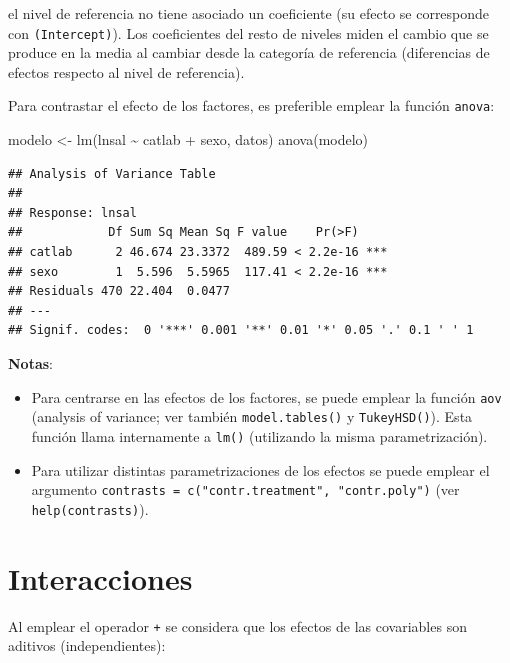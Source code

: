 \documentclass[
]{book}
\newenvironment{Shaded}{\begin{snugshade}}{\end{snugshade}}
\newcommand{\FunctionTok}[1]{\textcolor[rgb]{0.00,0.00,0.00}{#1}}
\newcommand{\NormalTok}[1]{#1}
\newcommand{\OtherTok}[1]{\textcolor[rgb]{0.56,0.35,0.01}{#1}}
\newcommand{\SpecialCharTok}[1]{\textcolor[rgb]{0.00,0.00,0.00}{#1}}
\theoremstyle{break}
\theoremstyle{nonumberplain}
\begin{document}
el nivel de referencia no tiene asociado un coeficiente (su efecto se corresponde con \texttt{(Intercept)}). Los coeficientes del resto de niveles miden el cambio que se produce en la media al cambiar desde la categoría de referencia (diferencias de efectos respecto al nivel de referencia).

Para contrastar el efecto de los factores, es preferible emplear la función \texttt{anova}:

\begin{Shaded}
\begin{Highlighting}[]
\NormalTok{modelo }\OtherTok{\textless{}{-}} \FunctionTok{lm}\NormalTok{(lnsal }\SpecialCharTok{\textasciitilde{}}\NormalTok{ catlab }\SpecialCharTok{+}\NormalTok{ sexo, datos)}
\FunctionTok{anova}\NormalTok{(modelo)}
\end{Highlighting}
\end{Shaded}

\begin{verbatim}
## Analysis of Variance Table
## 
## Response: lnsal
##            Df Sum Sq Mean Sq F value    Pr(>F)    
## catlab      2 46.674 23.3372  489.59 < 2.2e-16 ***
## sexo        1  5.596  5.5965  117.41 < 2.2e-16 ***
## Residuals 470 22.404  0.0477                      
## ---
## Signif. codes:  0 '***' 0.001 '**' 0.01 '*' 0.05 '.' 0.1 ' ' 1
\end{verbatim}

\textbf{Notas}:

\begin{itemize}
\item
  Para centrarse en las efectos de los factores, se puede emplear la función
  \texttt{aov} (analysis of variance; ver también \texttt{model.tables()} y \texttt{TukeyHSD()}). Esta
  función llama internamente a \texttt{lm()} (utilizando la misma parametrización).
\item
  Para utilizar distintas parametrizaciones de los efectos se puede emplear
  el argumento \texttt{contrasts\ =\ c("contr.treatment",\ "contr.poly")}
  (ver \texttt{help(contrasts)}).
\end{itemize}

\hypertarget{interacciones}{%
\section{Interacciones}\label{interacciones}}

Al emplear el operador \texttt{+} se considera que los efectos de las covariables son aditivos (independientes):
\end{document}
